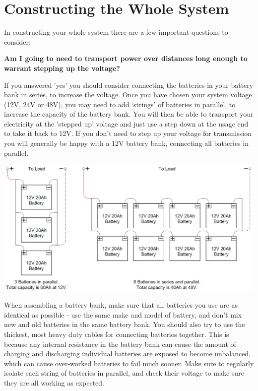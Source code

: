 \documentclass{article}
\theoremstyle{definition}
\theoremstyle{definition}
\theoremstyle{remark}
\begin{document}


\section{Constructing the Whole System} %
\label{sec:constructing_the_whole_system}

  In constructing your whole system there are a few important questions to consider:

  \textbf{Am I going to need to transport power over distances long enough to warrant stepping up the voltage?}

  If you answered 'yes' you should consider connecting the batteries in your battery bank in series, to increase the voltage. Once you have chosen your system voltage (12V, 24V or 48V), you may need to add ‘strings’ of batteries in parallel, to increase the capacity of the battery bank. You will then be able to transport your electricity at the 'stepped up' voltage and just use a step down at the usage end to take it back to 12V. If you don't need to step up your voltage for transmission you will generally be happy with a 12V battery bank, connecting all batteries in parallel.

  \begin{center}
    \includegraphics[width=0.75\paperwidth]{Images/image_13_1_(whole_system_1).png}
  \end{center}

  When assembling a battery bank, make sure that all batteries you use are as identical as possible - use the same make and model of battery, and don’t mix new and old batteries in the same battery bank. You should also try to use the thickest, most heavy duty cables for connecting batteries together. This is because any internal resistance in the battery bank can cause the amount of charging and discharging individual batteries are exposed to become unbalanced, which can cause over-worked batteries to fail much sooner. Make sure to regularly isolate each string of batteries in parallel, and check their voltage to make sure they are all working as expected. 
\end{document}
